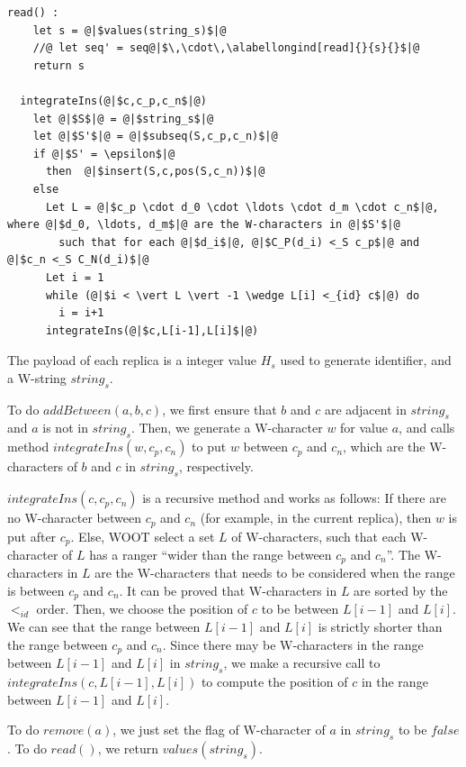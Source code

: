 {\begin{minipage}[t]{1.0\linewidth}
\begin{lstlisting}[frame=top,caption={Pseudo-code of WOOT algorithm},
captionpos=b,label={lst:woot algorithm}]
  read() :
    let s = @|$values(string_s)$|@
    //@ let seq' = seq@|$\,\cdot\,\alabellongind[read]{}{s}{}$|@
    return s

  integrateIns(@|$c,c_p,c_n$|@)
    let @|$S$|@ = @|$string_s$|@
    let @|$S'$|@ = @|$subseq(S,c_p,c_n)$|@
    if @|$S' = \epsilon$|@
      then  @|$insert(S,c,pos(S,c_n))$|@
    else
      Let L = @|$c_p \cdot d_0 \cdot \ldots \cdot d_m \cdot c_n$|@, where @|$d_0, \ldots, d_m$|@ are the W-characters in @|$S'$|@
        such that for each @|$d_i$|@, @|$C_P(d_i) <_S c_p$|@ and @|$c_n <_S C_N(d_i)$|@
      Let i = 1
      while (@|$i < \vert L \vert -1 \wedge L[i] <_{id} c$|@) do
        i = i+1
      integrateIns(@|$c,L[i-1],L[i]$|@)
\end{lstlisting}
\end{minipage}

The payload of each replica is a integer value $H_s$ used to generate identifier, and a W-string $string_s$.

To do $addBetween(a,b,c)$, we first ensure that $b$ and $c$ are adjacent in $string_s$ and $a$ is not in $string_s$. Then, we generate a W-character $w$ for value $a$, and calls method $integrateIns(w,c_p,c_n)$ to put $w$ between $c_p$ and $c_n$, which are the W-characters of $b$ and $c$ in $string_s$, respectively.

$integrateIns(c,c_p,c_n)$ is a recursive method and works as follows: If there are no W-character between $c_p$ and $c_n$ (for example, in the current replica), then $w$ is put after $c_p$. Else, WOOT select a set $L$ of W-characters, such that each W-character of $L$ has a ranger ``wider than the range between $c_p$ and $c_n$''. The W-characters in $L$ are the W-characters that needs to be considered when the range is between $c_p$ and $c_n$. It can be proved that W-characters in $L$ are sorted by the $<_{id}$ order. Then, we choose the position of $c$ to be between $L[i-1]$ and $L[i]$. We can see that the range between $L[i-1]$ and $L[i]$ is strictly shorter than the range between $c_p$ and $c_n$. Since there may be W-characters in the range between $L[i-1]$ and $L[i]$ in $string_s$, we make a recursive call to $integrateIns(c,L[i-1],L[i])$ to compute the position of $c$ in the range between $L[i-1]$ and $L[i]$.

To do $remove(a)$, we just set the flag of W-character of $a$ in $string_s$ to be $\mathit{false}$. To do $read()$, we return $values(string_s)$.
}




